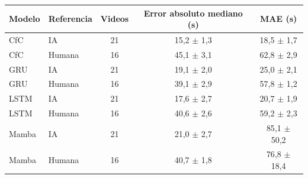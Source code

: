 \begin{tabular}{|l|l|c|c|c|}
\hline
\textbf{Modelo} & \textbf{Referencia} & \textbf{Videos} & \textbf{Error absoluto mediano (s)} & \textbf{MAE (s)} \\ \hline
CfC & IA & 21 & 15{,}2 $\pm$ 1{,}3 & 18{,}5 $\pm$ 1{,}7 \\ \hline
CfC & Humana & 16 & 45{,}1 $\pm$ 3{,}1 & 62{,}8 $\pm$ 2{,}9 \\ \hline
GRU & IA & 21 & 19{,}1 $\pm$ 2{,}0 & 25{,}0 $\pm$ 2{,}1 \\ \hline
GRU & Humana & 16 & 39{,}1 $\pm$ 2{,}9 & 57{,}8 $\pm$ 1{,}2 \\ \hline
LSTM & IA & 21 & 17{,}6 $\pm$ 2{,}7 & 20{,}7 $\pm$ 1{,}9 \\ \hline
LSTM & Humana & 16 & 40{,}6 $\pm$ 2{,}6 & 59{,}2 $\pm$ 2{,}3 \\ \hline
Mamba & IA & 21 & 21{,}0 $\pm$ 2{,}7 & 85{,}1 $\pm$ 50{,}2 \\ \hline
Mamba & Humana & 16 & 40{,}7 $\pm$ 1{,}8 & 76{,}8 $\pm$ 18{,}4 \\ \hline
\end{tabular}
